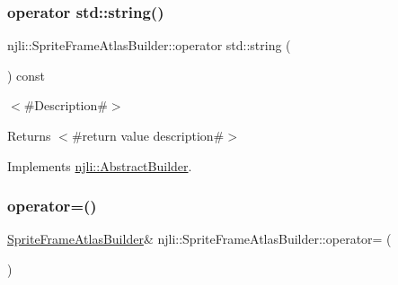 \subsubsection{\texorpdfstring{operator std\+::string()}{operator std::string()}}
{\footnotesize\ttfamily njli\+::\+Sprite\+Frame\+Atlas\+Builder\+::operator std\+::string (\begin{DoxyParamCaption}{ }\end{DoxyParamCaption}) const\hspace{0.3cm}{\ttfamily [virtual]}}

$<$\#\+Description\#$>$

\begin{DoxyReturn}{Returns}
$<$\#return value description\#$>$ 
\end{DoxyReturn}


Implements \mbox{\hyperlink{classnjli_1_1_abstract_builder_a3e6e553e06d1ca30517ad5fb0bd4d000}{njli\+::\+Abstract\+Builder}}.

\mbox{\label{classnjli_1_1_sprite_frame_atlas_builder_a7ede2fb5ac211101e11c848c5ccacc19}} 
\subsubsection{\texorpdfstring{operator=()}{operator=()}}
{\footnotesize\ttfamily \mbox{\hyperlink{classnjli_1_1_sprite_frame_atlas_builder}{Sprite\+Frame\+Atlas\+Builder}}\& njli\+::\+Sprite\+Frame\+Atlas\+Builder\+::operator= (\begin{DoxyParamCaption}\item[{const \mbox{\hyperlink{classnjli_1_1_sprite_frame_atlas_builder}{Sprite\+Frame\+Atlas\+Builder}} \&}]{ }\end{DoxyParamCaption})\hspace{0.3cm}{\ttfamily [protected]}}

\mbox{\label{classnjli_1_1_sprite_frame_atlas_builder_af3f07049fa7006d2bc598661aead34c0}} 
